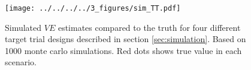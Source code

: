 \begin{appendices}
\begin{refsection}
    \begin{figure}[p]
        \centering
        \texttt{[image: ../../../../3\_figures/sim\_TT.pdf]}
        \caption{Simulated $VE$ estimates compared to the truth for four different target trial designs described in section \ref{sec:simulation}. Based on 1000 monte carlo simulations. Red dots shows true value in each scenario.\label{fig:sim_tt}}
    \end{figure}
    
    \clearpage
    

    \printbibliography[heading=subbibliography]
\end{refsection}
\end{appendices}